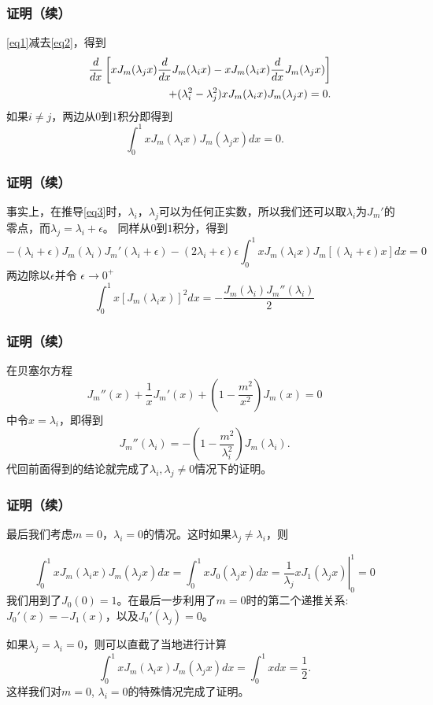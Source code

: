 \documentclass[CJK]{beamer}
\begin{document}
\begin{frame}
  \frametitle{证明（续）}
  
  \eqref{eq1}减去\eqref{eq2}，得到
  \begin{eqnarray}
 && \frac{d}{dx}\left[ xJ_m(\lambda_jx)\frac{d}{dx} J_m(\lambda_i x) - xJ_m(\lambda_ix)\frac{d}{dx} J_m(\lambda_j x) \right] \nonumber \\
  && + (\lambda_i^2-\lambda_j^2)xJ_m(\lambda_ix)J_m(\lambda_jx) = 0. \label{eq3}
  \end{eqnarray}
  如果$i\ne j$，两边从$0$到$1$积分即得到
  $$\int_0^1 xJ_m(\lambda_ix)J_m(\lambda_jx) dx= 0. $$
  
\end{frame}


\begin{frame}
  \frametitle{证明（续）}
  
  事实上，在推导\eqref{eq3}时，$\lambda_i$，$\lambda_j$可以为任何正实数，所以我们还可以取$\lambda_i$为$J_m'$的零点，而$\lambda_j = \lambda_i +\epsilon$。
    同样从$0$到$1$积分，得到
    $$ -(\lambda_i+\epsilon)J_m(\lambda_i) J_m'(\lambda_i+\epsilon)  -(2\lambda_i+\epsilon)\epsilon\int_0^1xJ_m(\lambda_ix)J_m[(\lambda_i+\epsilon)x]dx = 0 $$
    两边除以$\epsilon$并令 $\epsilon\rightarrow 0^+$
    $$ \int_0^1x\left[J_m(\lambda_ix)\right]^2dx = -\frac{J_m(\lambda_i)J_m''(\lambda_i)}{2} $$
    
  
\end{frame}

\begin{frame}
  \frametitle{证明（续）}
  
  在贝塞尔方程
  $$J_m''(x) + \frac{1}{x}J_m'(x) + \left(1-\frac{m^2}{x^2}\right)J_m(x) = 0$$
  中令$x = \lambda_i$，即得到
  $$J_m''(\lambda_i) = - \left(1-\frac{m^2}{\lambda_i^2}\right)J_m(\lambda_i).$$
  代回前面得到的结论就完成了$\lambda_i,\lambda_j \ne 0$情况下的证明。
  
\end{frame}


\begin{frame}
  \frametitle{证明（续）}
  
  最后我们考虑$m=0$，$\lambda_i=0$的情况。这时如果$\lambda_j\ne \lambda_i$，则
  

$$  \int_0^1 xJ_m(\lambda_ix)J_m(\lambda_jx) dx = \int_0^1xJ_0(\lambda_j x) dx
 = \left. \frac{1}{\lambda_j} xJ_1(\lambda_j x) \right\vert_0^1 =0 $$
我们用到了$J_0(0)=1$。在最后一步利用了$m=0$时的第二个递推关系: $J_0'(x) = - J_1(x)$，以及$J_0'(\lambda_j)=0$。

\skipline

  如果$\lambda_j=\lambda_i=0$，则可以直截了当地进行计算
  $$  \int_0^1 xJ_m(\lambda_ix)J_m(\lambda_jx) dx = \int_0^1 x dx  = \frac{1}{2} .$$
  这样我们对$m=0$, $\lambda_i=0$的特殊情况完成了证明。
  
\end{frame}
\end{document}
